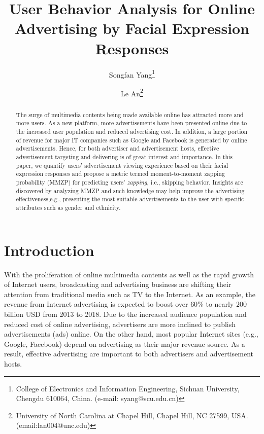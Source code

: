 \documentclass[twoside,leqno,twocolumn]{article}
\begin{document}

\title{\Large User Behavior Analysis for Online Advertising by Facial Expression Responses}
\author{Songfan Yang\thanks{College of Electronics and Information Engineering,
Sichuan University, Chengdu 610064, China. (e-mail: syang@scu.edu.cn)} \\
\and
Le An\thanks{University of North Carolina at Chapel Hill, Chapel Hill, NC 27599, USA. (email:lan004@unc.edu)}}
\date{}

\maketitle



\begin{abstract} \small\baselineskip=9pt The surge of multimedia contents being made available online has attracted more and more users. As a new platform, more advertisements have been presented online due to the increased user population and reduced advertising cost. In addition, a large portion of revenue for major IT companies such as Google and Facebook is generated by online advertisements. Hence, for both advertiser and advertisement hosts, effective advertisement targeting and delivering is of great interest and importance. In this paper, we quantify users' advertisement viewing experience based on their facial expression responses and propose a metric termed moment-to-moment zapping probability (MMZP) for predicting users' \textit{zapping}, i.e., skipping behavior. Insights are discovered by analyzing MMZP and such knowledge may help improve the advertising effectiveness,e.g., presenting the most suitable advertisements to the user with specific attributes such as gender and ethnicity.\end{abstract}

\section{Introduction}
With the proliferation of online multimedia contents as well as the rapid growth of Internet users, broadcasting and advertising business are shifting their attention from traditional media such as TV to the Internet. As an example, the revenue from Internet advertising is expected to boost over $60\%$ to nearly $200$ billion USD from 2013 to 2018. Due to the increased audience population and reduced cost of online advertising, advertisers are more inclined to publish advertisements (ads) online. On the other hand, most popular Internet sites (e.g., Google, Facebook) depend on advertising as their major revenue source. As a result, effective advertising are important to both advertisers and advertisement hosts.
\end{document}
